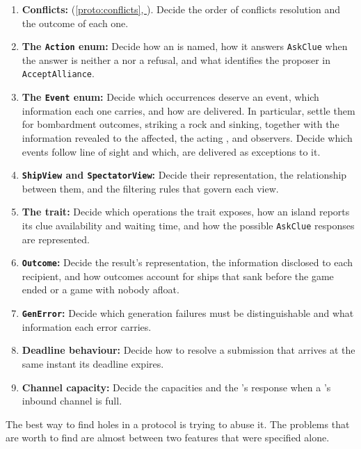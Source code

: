 \documentclass{article}
\newcommand{\fullref}[1]{\hyperref[#1]{\cref*{#1}, \nameref*{#1}}}
\begin{document}
\begin{enumerate}
    \item \textbf{Conflicts:} (\fullref{proto:conflicts}).
      Decide the order of conflicts resolution and the outcome of each one.
    \item \textbf{The \texttt{Action} enum:} Decide how an \island{} is named, how it answers
      \texttt{AskClue} when the answer is neither a \clue{} nor a refusal, and what identifies
      the proposer in \texttt{AcceptAlliance}.
    \item \textbf{The \texttt{Event} enum:} Decide which occurrences deserve an event,
      which information each one carries, and how are delivered. In particular, settle
      them for bombardment outcomes, striking a rock and sinking, together with the
      information revealed to the affected, the acting \ship{}, and observers. Decide
      which events follow line of sight and which, are delivered as exceptions to it.
    \item \textbf{\texttt{ShipView} and \texttt{SpectatorView}:} Decide their representation,
      the relationship between them, and the filtering rules that govern each view.
    \item \textbf{The \island{} trait:} Decide which operations the trait exposes, how an island
      reports its clue availability and waiting time, and how the possible \texttt{AskClue}
      responses are represented.
    \item \textbf{\texttt{Outcome}:} Decide the result's representation, the information disclosed
      to each recipient, and how outcomes account for ships that sank before the game ended or a
      game with nobody afloat.
    \item \textbf{\texttt{GenError}:} Decide which generation failures must be distinguishable
      and what information each error carries.
    \item \textbf{Deadline behaviour:} Decide how to resolve a submission that arrives at the
      same instant its deadline expires.
    \item \textbf{Channel capacity:} Decide the capacities and the \admiralty's response when a
      \ship's inbound channel is full.
\end{enumerate}

The best way to find holes in a protocol is trying to abuse it.
The problems that are worth to find are almost between two features that were specified alone.
\end{document}
